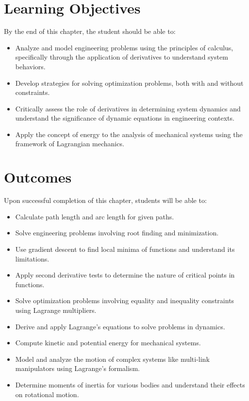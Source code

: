 \section*{Learning Objectives}
By the end of this chapter, the student should be able to:
\begin{itemize}
    \item Analyze and model engineering problems using the principles of calculus, specifically through the application of derivatives to understand system behaviors.
    \item Develop strategies for solving optimization problems, both with and without constraints.
    \item Critically assess the role of derivatives in determining system dynamics and understand the significance of dynamic equations in engineering contexts.
    \item Apply the concept of energy to the analysis of mechanical systems using the framework of Lagrangian mechanics.
\end{itemize}



\section*{Outcomes}

Upon successful completion of this chapter, students will be able to:
\begin{itemize}
    \item Calculate path length and arc length for given paths.
    \item Solve engineering problems involving root finding and minimization.
    \item Use gradient descent to find local minima of functions and understand its limitations.
    \item Apply second derivative tests to determine the nature of critical points in functions.
    \item Solve optimization problems involving equality and inequality constraints using Lagrange multipliers.
    \item Derive and apply Lagrange’s equations to solve problems in dynamics.
    \item Compute kinetic and potential energy for mechanical systems.
    \item Model and analyze the motion of complex systems like multi-link manipulators using Lagrange’s formalism.
    \item Determine moments of inertia for various bodies and understand their effects on rotational motion.
\end{itemize}

